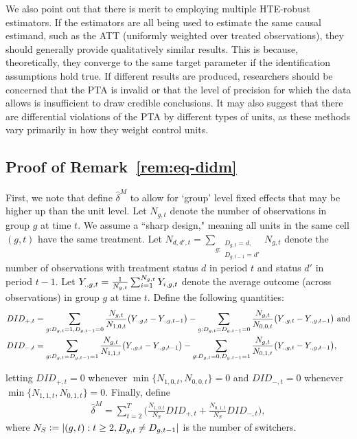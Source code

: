 \documentclass[12pt]{article}
\begin{document}
We also point out that there is merit to employing multiple HTE-robust estimators. If the estimators are all being used to estimate the same causal estimand, such as the ATT (uniformly weighted over treated observations), they should generally provide qualitatively similar results. This is because, theoretically, they converge to the same target parameter if the identification assumptions hold true. If different results are produced, researchers should be concerned that the PTA is invalid or that the level of precision for which the data allows is insufficient to draw credible conclusions. It may also suggest that there are differential violations of the PTA by different types of units, as these methods vary primarily in how they weight control units. 



\clearpage
\subsection{Proof of Remark~\ref{rem:eq-didm}}



First, we note that \citet{CDH2020} define $\hat\delta^M$ to allow for `group' level fixed effects that may be higher up than the unit level. 
Let $N_{g,t}$ denote the number of observations in group $g$ at time $t$. 
We assume a ``sharp design," meaning all units in the same cell $(g,t)$ have the same treatment. 
Let $N_{d,d',t}=\sum_{g:\substack{D_{g,t}=d, \\ D_{g,t-1}=d'}}N_{g,t}$ denote the number of observations with treatment status $d$ in period $t$ and status $d'$ in period $t-1$.
Let $Y_{.,g,t}=\frac{1}{N_{g,t}}\sum^{N_{g,t}}_{i=1}Y_{i,g,t}$ denote the average outcome (across observations) in group $g$ at time $t$. Define the following quantities:
\begin{align*}
    DID_{+,t}&=
    \sum_{g:D_{g,t}=1, D_{g, t-1}=0}
        \frac{N_{g,t}}{N_{1,0,t}}
        \big(Y_{.,g,t} - Y_{.,g,t-1} \big) 
    - \sum_{g:D_{g,t}=D_{g, t-1}=0}
        \frac{N_{g,t}}{N_{0,0,t}}
        \big(Y_{.,g,t} - Y_{.,g,t-1} \big) \text{ and}
\\
    DID_{-,t}&=\sum_{g:D_{g,t}=D_{g, t-1}=1}
        \frac{N_{g,t}}{N_{1,1,t}}
        \big(Y_{.,g,t} - Y_{.,g,t-1} \big) 
    - \sum_{g:D_{g,t}=0,D_{g, t-1}=1}
        \frac{N_{g,t}}{N_{0,1,t}}
        \big(Y_{.,g,t} - Y_{.,g,t-1} \big),
\end{align*}

letting $DID_{+,t}=0$ whenever $\min\{N_{1,0,t}, N_{0,0,t}\}=0$ and $DID_{-,t}=0$ whenever $\min\{N_{1,1,t}, N_{0,1,t}\}=0$. Finally, define
\begin{align*}
    \hat\delta^{M}=\sum^{T}_{t=2} 
        \Bigg( \frac{N_{1,0,t}}{N_S}DID_{+,t} +
               \frac{N_{0,1,t}}{N_S}DID_{-,t}
        \Bigg),
\end{align*}   
where $N_S\vcentcolon= |(g,t):t\geq2, D_{g,t}\neq D_{g,t-1}|$ is the number of switchers.
\end{document}
